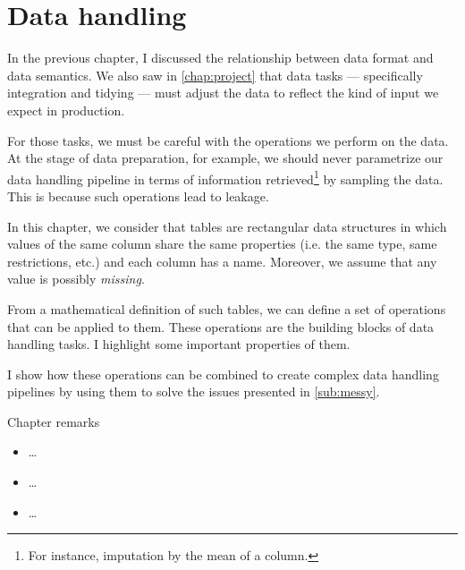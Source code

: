 \chapter{Data handling}
\label{chap:handling}



In the previous chapter, I discussed the relationship between data format and data
semantics.  We also saw in \cref{chap:project} that data tasks --- specifically
integration and tidying --- must adjust the data to reflect the kind of
input we expect in production.

For those tasks, we must be careful with the operations we perform on the data. At the
stage of data preparation, for example, we should never parametrize our data handling
pipeline in terms of information retrieved\footnote{For instance, imputation by the mean
of a column.} by sampling the data.  This is because such operations lead to \gls{leakage}.

In this chapter, we consider that tables are rectangular data structures in which values
of the same column share the same properties (i.e. the same type, same restrictions, etc.)
and each column has a name.  Moreover, we assume that any value is possibly
\emph{missing}.

From a mathematical definition of such tables, we can define a set of operations that can
be applied to them.  These operations are the building blocks of data handling tasks.
I highlight some important properties of them.

I show how these operations can be combined to create complex data handling pipelines by
using them to solve the issues presented in \cref{sub:messy}.

\begin{mainbox}{Chapter remarks}


  \startcontents[chapters]
  \vspace{1em}


  \begin{itemize}
    \item \dots
  \end{itemize}


  \begin{itemize}
    \item \dots
  \end{itemize}


  \begin{itemize}
    \item \dots
  \end{itemize}
\end{mainbox}

